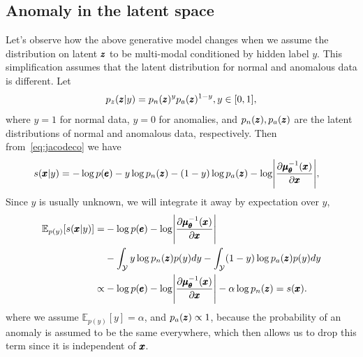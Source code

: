 \subsection{Anomaly in the latent space}
Let's observe how the above generative model changes when we assume the distribution on latent $\pmb{{z}}$ to be multi-modal conditioned by hidden label $y$. This simplification assumes that the latent distribution for normal and anomalous data is different. Let
\begin{equation} \label{eq:pzy}
p_z(\pmb{{z}}\vert y)=p_{n}(\pmb{{z}})^{y}p_{a}(\pmb{{z}})^{1-y},y\in[0,1],
\end{equation}
where $y=1$ for normal data, $y=0$ for anomalies, and $p_n(\pmb{{z}}),p_a(\pmb{{z}})$ are the latent distributions of normal and anomalous data, respectively. Then from~\eqref{eq:jacodeco} we have
\begin{align*}
s(\vc{x} \vert y) & = - \log p(\vc{e}) -y\log p_{n}(\vc{z})  -(1-y)\log p_{a}(\vc{z}) - \log\left\vert \frac{\partial \vc{\mu}_{\vc{\theta}}^{-1}(\vc{x})}{\partial \vc{x}}\right\vert,
\end{align*}
Since $y$ is usually unknown, we will integrate it away by expectation over $y$, 
\begin{align}
\mathbb{E}_{p(y)} \left[  s(\vc{x} \vert y) \right]  = &  - \log p(\vc{e}) - \log\left\vert \frac{\partial \vc{\mu}_{\vc{\theta}}^{-1}(\vc{x})}{\partial \vc{x}}\right\vert \nonumber \\ 
 & - \int_{\mathcal{Y}} y\log p_{n}(\vc{z}) p(y) dy - \int_{\mathcal{Y}} (1-y)\log p_{a}(\vc{z}) p(y) dy \nonumber \\
   \propto & - \log p(\vc{e}) - \log\left\vert \frac{\partial \vc{\mu}_{\vc{\theta}}^{-1}(\vc{x})}{\partial \vc{x}}\right\vert  - \alpha\log p_{n}(\vc{z}) = s(\vc{x}). \label{eq:jacodeco2}
\end{align}
where we assume $\mathbb{E}_{p(y)} \left[  y \right] =\alpha$, and $p_{a}(\pmb{{z}}) \propto 1$, because the probability of an anomaly is assumed to be the same everywhere, which then allows us to drop this term since it is independent of $\pmb{{x}}$.  


